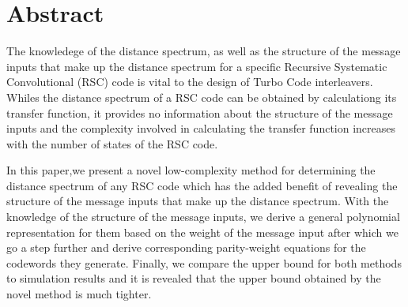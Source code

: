 \section{Abstract}
The knowledege of the distance spectrum, as well as the structure of the message inputs that make up the distance spectrum for a specific Recursive Systematic Convolutional (RSC) code is vital to the design of Turbo Code interleavers. Whiles the distance spectrum of a RSC code can be obtained by calculationg its transfer function, it provides no information about the structure of the message inputs and the complexity involved in calculating the transfer function increases with the number of states of the RSC code.

In this paper,we present a novel low-complexity method for determining the distance spectrum of any RSC code which has the added benefit of revealing the structure of the message inputs that make up the distance spectrum.
 With the knowledge of the structure of the message inputs, we derive a general polynomial representation for them based on the weight of the message input after which we go a step further and derive corresponding parity-weight equations for the codewords they generate.
Finally, we compare the upper bound for both methods to simulation results and it is revealed that the upper bound obtained by the novel method is much tighter.